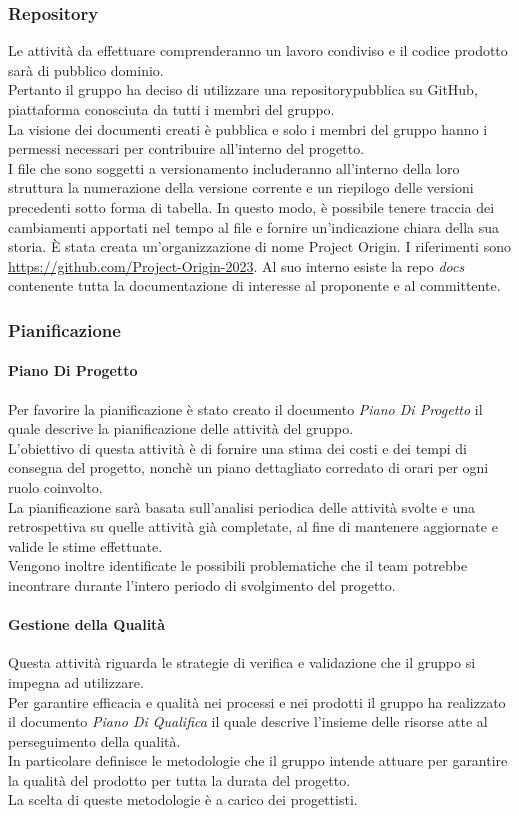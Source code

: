 \subsubsection{Repository} 
Le attività da effettuare comprenderanno un lavoro condiviso e il codice prodotto sarà di pubblico dominio. \\
Pertanto il gruppo ha deciso di utilizzare una repository\glo pubblica su GitHub\glo, piattaforma conosciuta da tutti i membri del gruppo. \\
La visione dei documenti creati è pubblica e solo i membri del gruppo hanno i permessi necessari per contribuire all'interno del progetto. \\
I file che sono soggetti a versionamento includeranno all'interno della loro struttura la numerazione della versione corrente e un riepilogo 
delle versioni precedenti sotto forma di tabella. In questo modo, è possibile tenere traccia dei cambiamenti apportati nel tempo al file e 
fornire un'indicazione chiara della sua storia.
È stata creata un'organizzazione di nome Project Origin. I riferimenti sono \url{https://github.com/Project-Origin-2023}.
Al suo interno esiste la repo \textit{docs} contenente tutta la documentazione di interesse al proponente e al committente.

\subsubsection{Pianificazione}\label{pianificazione}
\paragraph{Piano Di Progetto}
Per favorire la pianificazione è stato creato il documento \textit{Piano Di Progetto} il quale descrive la pianificazione delle attività del gruppo.\\
L’obiettivo di questa attività è di fornire una stima dei costi e dei tempi di consegna del progetto,
nonchè un piano dettagliato corredato di orari per ogni ruolo coinvolto.\\
La pianificazione sarà basata sull’analisi periodica delle attività svolte e una retrospettiva su quelle attività
già completate, al fine di mantenere aggiornate e valide le stime effettuate.\\
Vengono inoltre identificate le possibili problematiche che il team potrebbe incontrare
durante l’intero periodo di svolgimento del progetto.
\paragraph{Gestione della Qualità}
Questa attività riguarda le strategie di verifica e validazione che il gruppo si impegna ad utilizzare.\\
Per garantire efficacia e qualità nei processi e nei prodotti il gruppo ha realizzato il documento \textit{Piano Di Qualifica} il quale descrive l’insieme delle risorse atte al perseguimento della qualità.\\
In particolare definisce le metodologie che il gruppo intende attuare per
garantire la qualità del prodotto per tutta la durata del progetto.\\
La scelta di queste metodologie è a carico dei progettisti.

